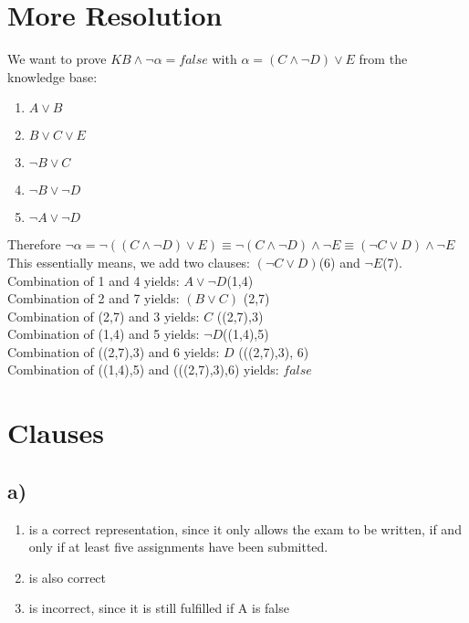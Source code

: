 \documentclass[a4paper]{article}
\begin{document}
\section{More Resolution}
We want to prove $KB \land \neg \alpha = false$ with $\alpha = (C \land \neg D) \lor E$ from the knowledge base:
\begin{enumerate}
	\item $A \lor B$
	\item $B \lor C \lor E$
	\item $\neg B \lor C$
	\item $\neg B \lor \neg D$
	\item $\neg A \lor \neg D$
\end{enumerate}
Therefore $\neg \alpha = \neg((C \land \neg D) \lor E) \equiv \neg(C \land \neg D) \land \neg E \equiv (\neg C \lor D) \land \neg E$\\
This essentially means, we add two clauses: $(\neg C \lor D)$(6) and $\neg E$(7).\\
Combination of 1 and 4 yields: $A \lor \neg D$(1,4) \\
Combination of 2 and 7 yields: $(B \lor C)$ (2,7)\\
Combination of (2,7) and 3 yields: $C$ ((2,7),3)\\
Combination of (1,4) and 5 yields: $\neg D$((1,4),5)\\
Combination of ((2,7),3) and 6 yields: $D$ (((2,7),3), 6)\\
Combination of ((1,4),5) and (((2,7),3),6) yields: $false$ \\

\section{Clauses}
\subsection*{a)}
	\begin{enumerate}
		\item is a correct representation, since it only allows the exam to be written, if and only if at least five assignments have been submitted.
		\item is also correct
		\item is incorrect, since it is still fulfilled if A is false
	\end{enumerate}
\end{document}

